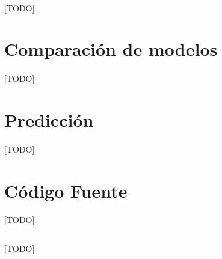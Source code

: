 \documentclass[a4paper, spanish]{article}
\begin{document}
    \paragraph{}
    [TODO]

  \section{Comparación de modelos}

    \paragraph{}
    [TODO]

  \section{Predicción}

    \paragraph{}
    [TODO]

  \appendix
  \section{Código Fuente}

    \paragraph{}
    [TODO]


    \begin{listing}[H]
        \centering
        \inputminted{R}{./res/code/weight-loss.r}
        \caption{[TODO]}
        \label{}
      \end{listing}
\end{document}
